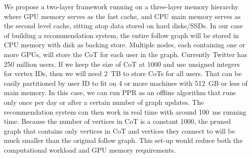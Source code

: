 \documentclass{article}
\begin{document}
We propose a two-layer framework running on a three-layer memory hierarchy where GPU memory serves as the fast cache, and CPU main memory serves as the second level cache, sitting atop data stored on hard disks/SSDs. In our case of building a recommendation system, the entire follow graph will be stored in CPU memory with disk as backing store. Multiple nodes, each containing one or more GPUs, will store the CoT for each user in the graph. Currently Twitter has 250 million users.  If we keep the size of CoT at 1000 and use unsigned integers for vertex IDs, then we will need 2~TB to store CoTs for all users. That can be easily partitioned by user ID to fit on 4 or more machines with 512~GB or less of main memory. In this case, we can run PPR as an offline algorithm that runs only once per day or after a certain number of graph updates. The recommendation system can then work in real time with around 100~ms running time. Because the number of vertices in CoT is a constant 1000, the pruned graph that contains only vertices in CoT and vertices they connect to will be much smaller than the original follow graph. This set-up would reduce both the computational workload and GPU memory requirements.
\end{document}
